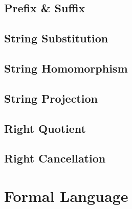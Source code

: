 \subsection{Prefix \& Suffix}\label{sec:prefix_suffix}

\subsection{String Substitution}\label{sec:string_substitution}

\subsection{String Homomorphism}\label{sec:string_homomorphism}

\subsection{String Projection}\label{sec:string_projection}

\subsection{Right Quotient}\label{sec:right_quotient}

\subsection{Right Cancellation}\label{sec:right_cancellation}



\section{Formal Language}\label{sec:formal_language}

